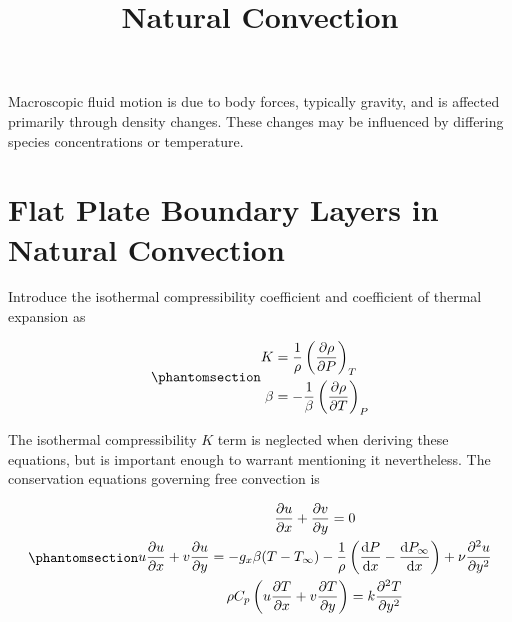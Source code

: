 \documentclass[
  a3paper,
  DIV=11,
  numbers=noendperiod,
  portrait]{scrartcl}
\title{Natural Convection}
\author{}
\date{}
\renewcommand*\contentsname{Table of contents}
\newcommand\contentsname{Table of contents}
\begin{document}
\maketitle

\renewcommand*\contentsname{Table of contents}
{
\setcounter{tocdepth}{3}
\tableofcontents
}

Macroscopic fluid motion is due to body forces, typically gravity, and
is affected primarily through density changes. These changes may be
influenced by differing species concentrations or temperature.

\section{Flat Plate Boundary Layers in Natural
Convection}\label{flat-plate-boundary-layers-in-natural-convection}

Introduce the isothermal compressibility coefficient and coefficient of
thermal expansion as

\begin{equation}\protect\phantomsection\label{eq-coefficient-definitions}{
\begin{align*}
K & =\frac 1{\rho}\left(\frac {\partial\rho}{\partial P}\right)_T \\
\beta & =-\frac 1{\beta}\left(\frac {\partial\rho}{\partial T}\right)_P
\end{align*}
}\end{equation}

The isothermal compressibility \(K\) term is neglected when deriving
these equations, but is important enough to warrant mentioning it
nevertheless. The conservation equations governing free convection is

\begin{equation}\protect\phantomsection\label{eq-conservation-equations}{
\begin{gather*}
\frac {\partial u}{\partial x}+\frac {\partial v}{\partial y}=0 \\
u\frac {\partial u}{\partial x}+v\frac {\partial u}{\partial y}=-g_x\beta(T-T_{\infty})-\frac 1{\rho}\left(\frac {\mathrm dP}{\mathrm dx}-\frac {\mathrm dP_{\infty}}{\mathrm dx}\right)+\nu\frac {\partial^2u}{\partial y^2} \\
\rho C_p\left(u\frac {\partial T}{\partial x}+v\frac {\partial T}{\partial y}\right)=k\frac {\partial^2T}{\partial y^2}
\end{gather*}
}\end{equation}
\end{document}
